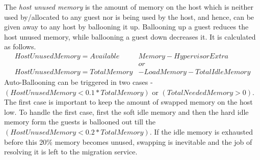 The \textit{host unused memory} is the amount of memory on the host which is neither used by/allocated to any guest nor is being used by the host, and hence, can be given away to any host by ballooning it up. Ballooning up a guest reduces the host unused memory, while ballooning a guest down decreases it. It is calculated as follows.
\begin{align*} 
Host Unused Memory = Available &Memory - Hypervisor Extra\\
&or\\
Host Unused Memory = Total Memory& - Load Memory - Total Idle Memory
\end{align*}
Auto-Ballooning can be triggered in two cases -  $(Host Unused Memory < 0.1*Total Memory)$ or $(Total Needed Memory>0)$.  The first case is important to keep the amount of swapped memory on the host low. To handle the first case, first the soft idle memory and then the hard idle memory form the guests is ballooned out till the $(Host Unused Memory < 0.2*Total Memory)$. If the idle memory is exhausted before this 20\% memory becomes unused, swapping is inevitable and the job of resolving it is left to the migration service.

